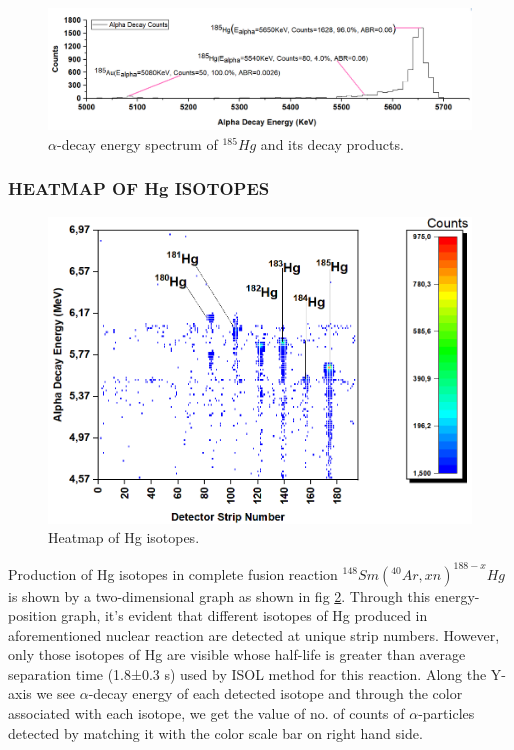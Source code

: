 \documentclass[12pt]{article}
\begin{document}
\begin{figure}[h]
\centering
\includegraphics[scale=0.52]{Hg185.png}
\caption{$\alpha$-decay energy spectrum of $^{185}Hg$ and its decay products.}
\label{alpha-decay energy spectrum of 185Hg and its decay products.}
\end{figure}


\subsubsection{HEATMAP OF Hg ISOTOPES}

\begin{figure}[h]
\centering
\includegraphics[scale=0.5]{Heatmap_Hg.png}
\caption{Heatmap of Hg isotopes.}
\label{Heatmap of Hg isotopes.}
\end{figure}


Production of Hg isotopes in complete fusion reaction $^{148}Sm(^{40}Ar,xn)^{188-x}Hg$ is shown by a two-dimensional graph as shown in fig \ref{Heatmap of Hg isotopes.}. Through this energy-position graph, it's evident that different isotopes of Hg produced in aforementioned nuclear reaction are detected at unique strip numbers. However, only those isotopes of Hg are visible whose half-life is greater than average separation time (1.8±0.3 s) used by ISOL method for this reaction. Along the Y-axis we see $\alpha$-decay energy of each detected isotope and through the color associated with each isotope, we get the value of no. of counts of $\alpha$-particles detected by matching it with the color scale bar on right hand side.
\end{document}
